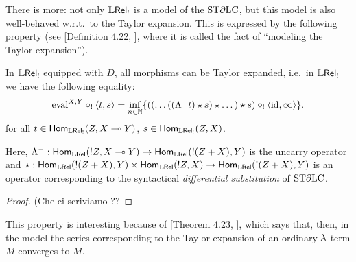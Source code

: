 There is more: not only $\mathbb{L} \mathsf{Rel}_!$ is a model of the $\mathrm{ST}\partial\mathrm{LC}$, but this model is also well-behaved w.r.t.\ to the \lamcalc Taylor expansion.
This is expressed by the following property (see [Definition 4.22, \cite{Manzo2010}], where it is called the fact of ``modeling the Taylor expansion'').

\begin{theorem}\label{thm:modelsTaylor}
 In $\mathbb{L} \mathsf{Rel}_!$ equipped with $D$, all morphisms can be Taylor expanded, i.e.\ in $\mathbb{L} \mathsf{Rel}_!$ we have the following equality:
 \[
  \mathrm{eval}^{X,Y}\circ_!\langle t,s\rangle =
  \inf\limits_{n\in\mathbb{N}}
  \{((\dots((\Lambda^- t)\star s)\star \dots)\star s)\circ_! \langle \mathrm{id},\infty \rangle\}.
 \]
 for all $t\in\mathsf{Hom}_{\mathbb{L} \mathsf{Rel}_!}(Z,X\multimap Y)$, $s\in\mathsf{Hom}_{\mathbb{L} \mathsf{Rel}_!}(Z,X)$.
\end{theorem}
Here, $\Lambda^-:\mathsf{Hom}_{\mathbb{L} \mathsf{Rel}}(!Z,X\multimap Y)\to \mathsf{Hom}_{\mathbb{L} \mathsf{Rel}}(!(Z+X),Y)$ is the uncarry operator and $\star:\mathsf{Hom}_{\mathbb{L} \mathsf{Rel}}(!(Z+X),Y)\times\mathsf{Hom}_{\mathbb{L} \mathsf{Rel}}(!Z,X)\to \mathsf{Hom}_{\mathbb{L} \mathsf{Rel}}(!(Z+X),Y)$ is an operator corresponding to the syntactical \emph{differential substitution} of $\mathrm{ST}\partial\mathrm{LC}$.
\begin{proof}
 {\color{red}(Che ci scriviamo ??}
\end{proof}

This property is interesting because of [Theorem 4.23, \cite{Manzo2010}], which says that, then, in the model the series corresponding to the Taylor expansion of an ordinary $\lambda$-term $M$ converges to $M$.
